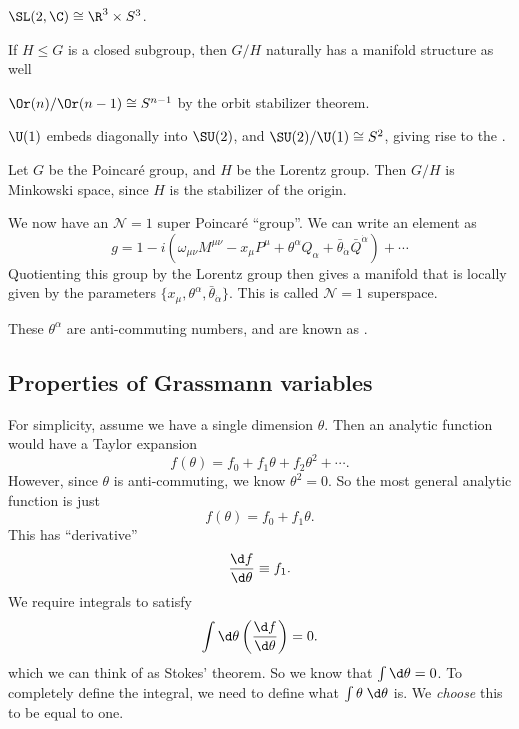 \documentclass[a4paper]{article}
\begin{document}
\begin{eg}
  $\SL(2, \C) \cong \R^3 \times S^3$.
\end{eg}

If $H \leq G$ is a closed subgroup, then $G/H$ naturally has a manifold structure as well
\begin{eg}
  $\Or(n)/\Or(n - 1) \cong S^{n - 1}$ by the orbit stabilizer theorem.
\end{eg}

\begin{eg}
  $\U(1)$ embeds diagonally into $\SU(2)$, and $\SU(2)/\U(1) \cong S^2$, giving rise to the .
\end{eg}

\begin{eg}
  Let $G$ be the Poincar\'e group, and $H$ be the Lorentz group. Then $G/H$ is Minkowski space, since $H$ is the stabilizer of the origin.
\end{eg}
We now have an $\mathcal{N} = 1$ super Poincar\'e ``group''. We can write an element as
\[
  g = 1 - i( \omega_{\mu\nu} M^{\mu\nu} - x_\mu P^\mu + \theta^\alpha Q_\alpha + \bar{\theta}_{\dot{\alpha}} \bar{Q}^{\dot{\alpha}}) + \cdots
\]
Quotienting this group by the Lorentz group then gives a manifold that is locally given by the parameters $\{x_\mu, \theta^\alpha, \bar{\theta}_{\dot{\alpha}}\}$. This is called $\mathcal{N} = 1$ superspace.

These $\theta^\alpha$ are anti-commuting numbers, and are known as .

\subsection{Properties of Grassmann variables}
For simplicity, assume we have a single dimension $\theta$. Then an analytic function would have a Taylor expansion
\[
  f(\theta) = f_0 + f_1 \theta + f_2 \theta^2 + \cdots.
\]
However, since $\theta$ is anti-commuting, we know $\theta^2 = 0$. So the most general analytic function is just
\[
  f(\theta) = f_0 + f_1 \theta.
\]
This has ``derivative''
\[
  \frac{\d f}{\d \theta} \equiv f_1.
\]
We require integrals to satisfy
\[
  \int \d \theta \left(\frac{\d f}{\d \theta}\right) = 0.
\]
which we can think of as Stokes' theorem. So we know that $\int \d \theta = 0$. To completely define the integral, we need to define what $\int \theta\;\d \theta$ is. We \emph{choose} this to be equal to one.
\end{document}
